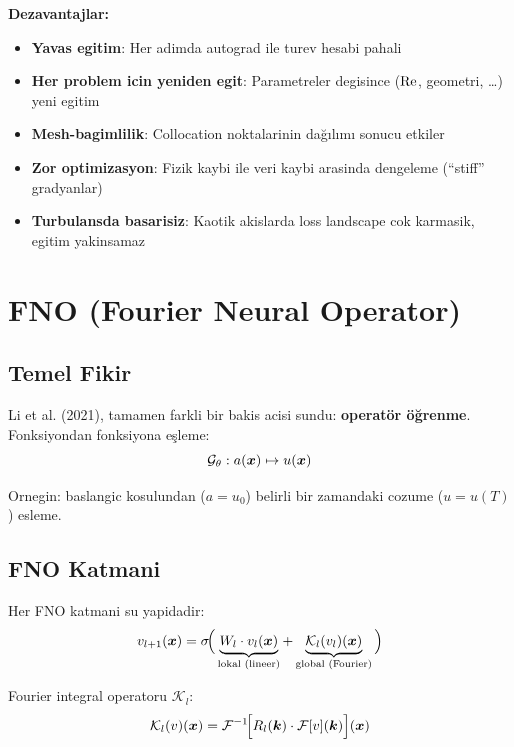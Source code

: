 \textbf{Dezavantajlar:}
\begin{itemize}
\item \textbf{Yavas egitim}: Her adimda autograd ile turev hesabi pahali
\item \textbf{Her problem icin yeniden egit}: Parametreler degisince ($\mathrm{Re}$, geometri, \ldots) yeni egitim
\item \textbf{Mesh-bagimlilik}: Collocation noktalarinin dağılımı sonucu etkiler
\item \textbf{Zor optimizasyon}: Fizik kaybi ile veri kaybi arasinda dengeleme (``stiff'' gradyanlar)
\item \textbf{Turbulansda basarisiz}: Kaotik akislarda loss landscape cok karmasik, egitim yakinsamaz
\end{itemize}


\section{FNO (Fourier Neural Operator)}
\label{sec:fno}

\subsection{Temel Fikir}

Li et al. (2021), tamamen farkli bir bakis acisi sundu: \textbf{operatör öğrenme}. Fonksiyondan fonksiyona eşleme:
\begin{equation}
\mathcal{G}_\theta: a(\bm{x}) \mapsto u(\bm{x})
\end{equation}

Ornegin: baslangic kosulundan ($a = u_0$) belirli bir zamandaki cozume ($u = u(T)$) esleme.

\subsection{FNO Katmani}

Her FNO katmani su yapidadir:
\begin{equation}
v_{l+1}(\bm{x}) = \sigma\!\Big(\underbrace{W_l\cdot v_l(\bm{x})}_{\text{lokal (lineer)}} + \underbrace{\mathcal{K}_l(v_l)(\bm{x})}_{\text{global (Fourier)}}\Big)
\label{eq:fno_layer}
\end{equation}

Fourier integral operatoru $\mathcal{K}_l$:
\begin{equation}
\mathcal{K}_l(v)(\bm{x}) = \mathcal{F}^{-1}\!\Big[R_l(\bm{k})\cdot\mathcal{F}[v](\bm{k})\Big](\bm{x})
\label{eq:fno_kernel}
\end{equation}

